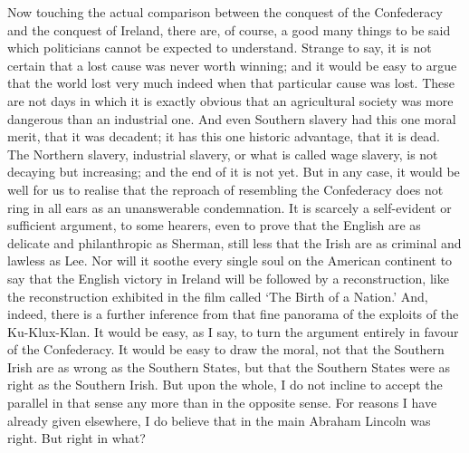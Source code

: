 \documentclass{book}
\begin{document}
Now touching the actual comparison between the conquest of the Confederacy and the conquest of Ireland, there are, of course, a good many things to be said which politicians cannot be expected to understand. Strange to say, it is not certain that a lost cause was never worth winning; and it would be easy to argue that the world lost very much indeed when that particular cause was lost. These are not days in which it is exactly obvious that an agricultural society was more dangerous than an industrial one. And even Southern slavery had this one moral merit, that it was decadent; it has this one historic advantage, that it is dead. The Northern slavery, industrial slavery, or what is called wage slavery, is not decaying but increasing; and the end of it is not yet. But in any case, it would be well for us to realise that the reproach of resembling the Confederacy does not ring in all ears as an unanswerable condemnation. It is scarcely a self-evident or sufficient argument, to some hearers, even to prove that the English are as delicate and philanthropic as Sherman, still less that the Irish are as criminal and lawless as Lee. Nor will it soothe every single soul on the American continent to say that the English victory in Ireland will be followed by a reconstruction, like the reconstruction exhibited in the film called ‘The Birth of a Nation.’ And, indeed, there is a further inference from that fine panorama of the exploits of the Ku-Klux-Klan. It would be easy, as I say, to turn the argument entirely in favour of the Confederacy. It would be easy to draw the moral, not that the Southern Irish are as wrong as the Southern States, but that the Southern States were as right as the Southern Irish. But upon the whole, I do not incline to accept the parallel in that sense any more than in the opposite sense. For reasons I have already given elsewhere, I do believe that in the main Abraham Lincoln was right. But right in what?
\end{document}
